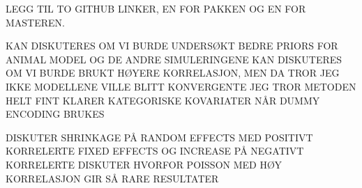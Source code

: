LEGG TIL TO GITHUB LINKER, EN FOR PAKKEN OG EN FOR MASTEREN.

KAN DISKUTERES OM VI BURDE UNDERSØKT BEDRE PRIORS FOR ANIMAL MODEL OG DE ANDRE SIMULERINGENE
KAN DISKUTERES OM VI BURDE BRUKT HØYERE KORRELASJON, MEN DA TROR JEG IKKE MODELLENE VILLE BLITT KONVERGENTE
JEG TROR METODEN HELT FINT KLARER KATEGORISKE KOVARIATER NÅR DUMMY ENCODING BRUKES

DISKUTER SHRINKAGE PÅ RANDOM EFFECTS MED POSITIVT KORRELERTE FIXED EFFECTS OG INCREASE PÅ NEGATIVT KORRELERTE
DISKUTER HVORFOR POISSON MED HØY KORRELASJON GIR SÅ RARE RESULTATER



